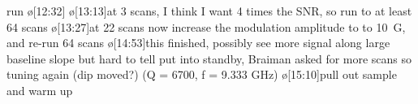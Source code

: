 run
\o[12:32]{}
\o[13:13]{at 3 scans, I think I want 4 times the SNR, so run to at least 64 scans}
\o[13:27]{at 22 scans now}
increase the modulation amplitude to to 10~G, and re-run 64 scans
\o[14:53]{this finished, possibly see more signal along large baseline slope but hard to tell}
put into standby, Braiman asked for more scans so tuning again (dip moved?)
(Q = 6700, f = 9.333 GHz)
\o[15:10]{pull out sample and warm up}




